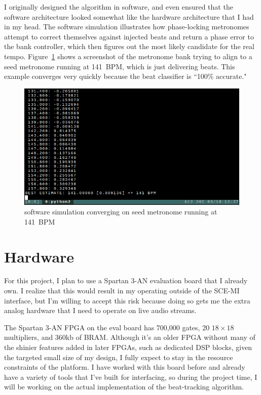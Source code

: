 \documentclass[letterpaper]{article}
\begin{document}
    I originally designed the algorithm in software, and even ensured that the
    software architecture looked somewhat like the hardware architecture that I
    had in my head.  The software simulation illustrates how phase-locking
    metronomes attempt to correct themselves against injected beats and return
    a phase error to the bank controller, which then figures out the most
    likely candidate for the real tempo.  Figure~\ref{fig:swscreenshot} shows a
    screenshot of the metronome bank trying to align to a seed metronome
    running at 141~BPM, which is just delivering beats.  This example converges
    very quickly because the beat classifier is ``100\% accurate."

    \begin{figure}
        \centering
        \includegraphics[scale=.5]{fig/swscreenshot.png}
        \caption{software simulation converging on seed metronome running at 141~BPM}
        \label{fig:swscreenshot}
    \end{figure}


\section{Hardware}

    For this project, I plan to use a Spartan 3-AN evaluation board that I
    already own.  I realize that this would result in my operating outside of
    the SCE-MI interface, but I'm willing to accept this risk because doing so
    gets me the extra analog hardware that I need to operate on live audio
    streams.

    The Spartan 3-AN FPGA on the eval board has 700,000 gates, 20 $18 \times
    18$ multipliers, and 360kb of BRAM.  Although it's an older FPGA without
    many of the shinier features added in later FPGAs, such as dedicated DSP
    blocks,  given the targeted small size of my design, I fully expect to stay
    in the resource constraints of the platform.  I have worked with this board
    before and already have a variety of tools that I've built for interfacing,
    so during the project time, I will be working on the actual implementation
    of the beat-tracking algorithm.
\end{document}

